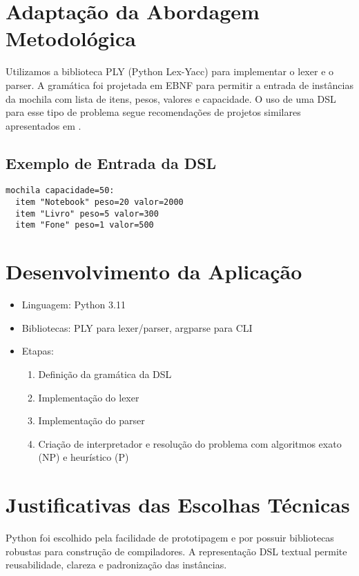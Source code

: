 \documentclass[conference]{IEEEtran}
\begin{document}
\section{Adaptação da Abordagem Metodológica}
Utilizamos a biblioteca PLY (Python Lex-Yacc) para implementar o lexer e o parser. A gramática foi projetada em EBNF para permitir a entrada de instâncias da mochila com lista de itens, pesos, valores e capacidade. O uso de uma DSL para esse tipo de problema segue recomendações de projetos similares apresentados em \cite{mernik2005dsl}.

\subsection{Exemplo de Entrada da DSL}
\begin{lstlisting}
mochila capacidade=50:
  item "Notebook" peso=20 valor=2000
  item "Livro" peso=5 valor=300
  item "Fone" peso=1 valor=500
\end{lstlisting}

\section{Desenvolvimento da Aplicação}
\begin{itemize}
    \item Linguagem: Python 3.11
    \item Bibliotecas: PLY para lexer/parser, argparse para CLI
    \item Etapas:
    \begin{enumerate}
        \item Definição da gramática da DSL
        \item Implementação do lexer
        \item Implementação do parser
        \item Criação de interpretador e resolução do problema com algoritmos exato (NP) e heurístico (P)
    \end{enumerate}
\end{itemize}

\section{Justificativas das Escolhas Técnicas}
Python foi escolhido pela facilidade de prototipagem e por possuir bibliotecas robustas para construção de compiladores. A representação DSL textual permite reusabilidade, clareza e padronização das instâncias.
\end{document}
